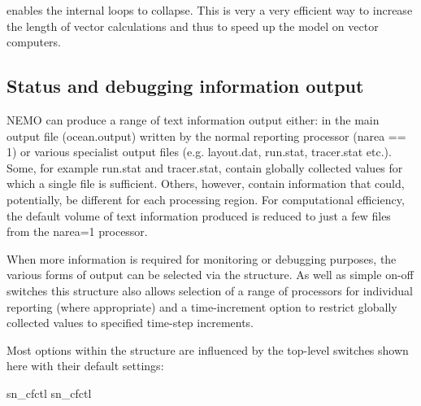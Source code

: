 \documentclass[../main/NEMO_manual]{subfiles}
\begin{document}
 enables the internal loops to collapse.
This is very a very efficient way to increase the length of vector calculations and thus
to speed up the model on vector computers.



\subsection{Status and debugging information output}


NEMO can produce a range of text information output either: in the main output
file (ocean.output) written by the normal reporting processor (narea == 1) or various
specialist output files (e.g. layout.dat, run.stat, tracer.stat etc.). Some, for example
run.stat and tracer.stat, contain globally collected values for which a single file is
sufficient. Others, however, contain information that could, potentially, be different
for each processing region. For computational efficiency, the default volume of text
information produced is reduced to just a few files from the narea=1 processor.

When more information is required for monitoring or debugging purposes, the various
forms of output can be selected via the  structure. As well as simple
on-off switches this structure also allows selection of a range of processors for
individual reporting (where appropriate) and a time-increment option to restrict
globally collected values to specified time-step increments.

Most options within the structure are influenced by the top-level switches shown here
with their default settings:

\begin{forlines}
   sn_cfctl%
     sn_cfctl%
\end{forlines}
\end{document}
